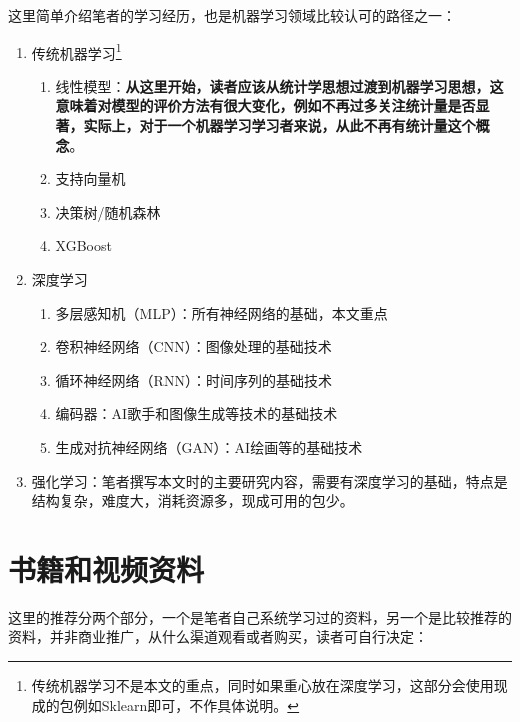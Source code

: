 \documentclass[a5paper, 11pt]{ctexbook}
\begin{document}
这里简单介绍笔者的学习经历，也是机器学习领域比较认可的路径之一\label{route}：
\begin{enumerate}
    \item[(1)] 传统机器学习\footnote{传统机器学习不是本文的重点，同时如果重心放在深度学习，这部分会使用现成的包例如Sklearn即可，不作具体说明。}
        \begin{enumerate}
            \item 线性模型：\textbf{从这里开始，读者应该从统计学思想过渡到机器学习思想，这意味着对模型的评价方法有很大变化，例如不再过多关注统计量是否显著，实际上，对于一个机器学习学习者来说，从此不再有统计量这个概念}。
            \item 支持向量机
            \item 决策树/随机森林
            \item XGBoost
        \end{enumerate}
    \item[(2)] 深度学习
        \begin{enumerate}
            \item 多层感知机（MLP）：所有神经网络的基础，本文重点
            \item 卷积神经网络（CNN）：图像处理的基础技术
            \item 循环神经网络（RNN）：时间序列的基础技术
            \item 编码器：AI歌手和图像生成等技术的基础技术
            \item 生成对抗神经网络（GAN）：AI绘画等的基础技术
        \end{enumerate}
    \item[(3)] 强化学习：笔者撰写本文时的主要研究内容，需要有深度学习的基础，特点是结构复杂，难度大，消耗资源多，现成可用的包少。
\end{enumerate}

\section*{书籍和视频资料}
这里的推荐分两个部分，一个是笔者自己系统学习过的资料，另一个是比较推荐的资料，并非商业推广，从什么渠道观看或者购买，读者可自行决定：
\end{document}
